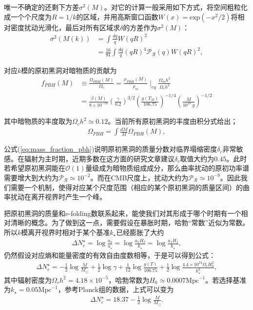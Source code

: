 唯一不确定的还剩下方差$\sigma^2(M)$。对它的计算一般采用如下方式，将空间粗粒化成一个个尺度为$R=1/k$的区域，并用高斯窗口函数$W(x)=\text{exp}(-x^2/2)$将相对密度扰动光滑化，最后对所有区域求$\delta$的方差作为$\sigma^2(M)$：
\begin{align}
    \sigma^2(M(k)) &= \int \frac{dq}{q}W{(qR)}^2 \\
    &= \frac{16}{81}\int \frac{dq}{q} {(qR)}^4 \mathcal{P_R}(q)W{(qR)}^2,
\end{align}

对应$k$模的原初黑洞对暗物质的贡献为
\begin{align*}
    f_{PBH}(M) &\equiv \frac{\Omega_{PBH}(M)}{\Omega_c} =
    \frac{\rho_{PBH}(M)}{\rho_m}\mid_{eq}\frac{\Omega_m h^2}{\Omega_c h^2}
    \\
    &= \frac{\beta(M)}{8\times
    10^{-16}}{\left(\frac{\gamma}{0.2}\right)}^{3/2}{\left(\frac{g(T_M)}{106.75}\right)}^{-1/4}{\left(\frac{M}{10^{18}\ g}\right)}^{-1/2}
\end{align*}

其中暗物质的丰度取为$\Omega_c h^2 \simeq 0.12$\citep{aghanim2018planck}。当前所有原初黑洞的丰度由积分式给出；
\begin{align}
    \label{eq:abundence_pbh}
    \Omega_{PBH} = \int \frac{dM}{M}\Omega_{PBH}(M),
\end{align}

公式{(\ref{eq:mass_fraction_pbh})}说明原初黑洞的质量分数对临界塌缩密度$\delta_c$非常敏感。在辐射为主时期，近期多数在这方面的研究文章\citep{musco2005computations,musco2009primordial,musco2013primordial,harada2013threshold}建议$\delta_c$取值大约为$0.45$。此时若希望原初黑洞能在$\mathcal{O}(1)$量级成为暗物质组成成分，那么曲率扰动的原初功率谱需要增大到大约为$\mathcal{P_R}\simeq
10^{-2}$。而在CMB尺度上，扰动大约为$\mathcal{P_R}\simeq
10^{-9}$。因此我们需要一个机制，使得对应某个尺度范围（相应的某个原初黑洞的质量区间）的曲率扰动在离开视界时产生一个峰。

把原初黑洞的质量和e-folding数联系起来，能使我们对其形成于哪个时期有一个相对清晰的概念。为了做到这一点，需要假设在暴胀时期，哈勃“常数”近似为常数。所以$k$模离开视界时相对于某个基准$k_\star$已经膨胀了大约
\begin{align}
    \label{eq:delta_efolding}
    \Delta N^{\star}_e = \log \frac{a_k}{a_\star} = \log\frac{a_k
    H_I}{k_\star} = \log \frac{a_f H_f}{k_\star},
\end{align}
仍然假设对应熵和能量密度的有效自由度数相等，于是可以得到公式\citep{motohashi2017primordial}：
\begin{align}
    \Delta N^{\star}_e =
    -\frac{1}{2}\log\frac{M}{M_\odot}+\frac{1}{2}\log\gamma
    +\frac{1}{12}\log\frac{g(T)}{106.75}+\frac{1}{2}\log\frac{4.4\times10^{24}\Omega_r
    H^2_0}{k^2_{\star}}, 
\end{align}
其中辐射密度为$\Omega_r h^2=4.18\times10^{-5}$，哈勃常数为$H_0\simeq
0.0007\text{Mpc}^{-1}$。若选择基准为$k_\star =
  0.05\text{Mpc}^{-1}$，参考Planck组的数据，上式可以变为
\begin{align}
    \Delta N^{\star}_e = 18.37-\frac{1}{2}\log\frac{M}{M_\odot}.
\end{align}


